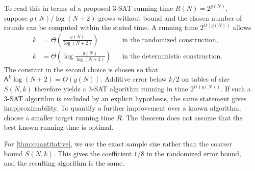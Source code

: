 \documentclass[11pt,letterpaper]{article} \usepackage[utf8]{inputenc}
\theoremstyle{plain} \newtheorem{theorem}{Theorem}[section]
\theoremstyle{definition} \newaliascnt{definition}{theorem}
\begin{document}
To read this in terms of a proposed $3$-SAT running time $R(N)=2^{g(N)}$,
suppose $g(N)/\log(N+2)$ grows without bound and the chosen number of rounds
can be computed within the stated time. A running time $2^{O(g(N))}$ allows
\[
\begin{aligned}
k&=\Theta\!\left(\frac{g(N)}{\log(N+2)}\right)
&&\text{in the randomized construction},\\
k&=\Theta\!\left(\log\frac{g(N)}{\log(N+2)}\right)
&&\text{in the deterministic construction}.
\end{aligned}
\]
The constant in the second choice is chosen so that
$\mathsf A^k\log(N+2)=O(g(N))$.
Additive error below $k/2$ on tables of size $S(N,k)$
therefore yields a $3$-SAT algorithm running in time $2^{O(g(N))}$. If such a $3$-SAT
algorithm is excluded by an explicit hypothesis, the same statement gives
inapproximability. To quantify a further improvement over a known algorithm,
choose a smaller target running time $R$. The theorem does not assume that the best
known running time is optimal.

For \cref{thm:quantitative}, we use the exact sample size rather than
the coarser bound $S(N,k)$. This gives the coefficient $1/8$ in the
randomized error bound, and the resulting algorithm is the same.
\end{document}
